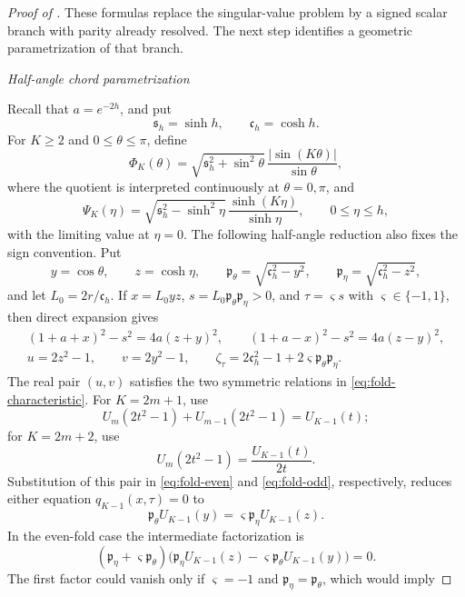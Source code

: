 \documentclass[12pt,anonymous]{iopjournal}
\numberwithin{equation}{section}
\theoremstyle{remark}
\newcommand{\proofstage}[1]{%
  \par\medskip\noindent\textit{#1}\par\nobreak\smallskip}
\begin{document}
\begin{proof}[Proof of ]
These formulas replace the singular-value problem by a signed scalar branch
with parity already resolved.  The next step identifies a geometric
parametrization of that branch.

\proofstage{Half-angle chord parametrization}
Recall that \(a=e^{-2h}\), and put
\[
 \mathfrak s_h=\sinh h,\qquad \mathfrak c_h=\cosh h.
\]
For \(K\geq2\) and \(0\leq\theta\leq\pi\), define
\begin{equation}\label{eq:Phi-Psi-def}
 \Phi_K(\theta)=\sqrt{\mathfrak s_h^2+\sin^2\theta}\,
 \frac{|\sin(K\theta)|}{\sin\theta},
\end{equation}
where the quotient is interpreted continuously at \(\theta=0,\pi\),
and
\[
 \Psi_K(\eta)=\sqrt{\mathfrak s_h^2-\sinh^2\eta}\,
 \frac{\sinh(K\eta)}{\sinh\eta},\qquad0\leq\eta\leq h,
\]
with the limiting value at \(\eta=0\).  The following half-angle reduction
also fixes the sign convention.  Put
\[
 y=\cos\theta,\qquad z=\cosh\eta,\qquad
 \mathfrak p_\theta=\sqrt{\mathfrak c_h^2-y^2},\qquad
 \mathfrak p_\eta=\sqrt{\mathfrak c_h^2-z^2},
\]
and let \(L_0=2r/\mathfrak c_h\).  If
\(x=L_0yz\), \(s=L_0\mathfrak p_\theta\mathfrak p_\eta>0\), and
\(\tau=\varsigma s\) with \(\varsigma\in\{-1,1\}\), then direct
expansion gives
\begin{equation}\label{eq:half-variable-identities}
\begin{gathered}
 (1+a+x)^2-s^2=4a(z+y)^2,\qquad
 (1+a-x)^2-s^2=4a(z-y)^2,\\
 u=2z^2-1,\qquad v=2y^2-1,\qquad
 \zeta_\tau=2\mathfrak c_h^2-1
 +2\varsigma\mathfrak p_\theta\mathfrak p_\eta.
\end{gathered}
\end{equation}
The real pair \((u,v)\) satisfies the two symmetric relations in
\eqref{eq:fold-characteristic}.
For \(K=2m+1\), use
\[
 U_m(2t^2-1)+U_{m-1}(2t^2-1)=U_{K-1}(t);
\]
for \(K=2m+2\), use
\[
 U_m(2t^2-1)=\frac{U_{K-1}(t)}{2t}.
\]
Substitution of this pair in \eqref{eq:fold-even} and
\eqref{eq:fold-odd}, respectively, reduces either equation
\(q_{K-1}(x,\tau)=0\) to
\begin{equation}\label{eq:signed-half-chord}
 \mathfrak p_\theta U_{K-1}(y)
 =\varsigma\mathfrak p_\eta U_{K-1}(z).
\end{equation}
In the even-fold case the intermediate factorization is
\[
 (\mathfrak p_\eta+\varsigma\mathfrak p_\theta)
 \bigl(\mathfrak p_\eta U_{K-1}(z)
 -\varsigma\mathfrak p_\theta U_{K-1}(y)\bigr)=0.
\]
The first factor could vanish only if \(\varsigma=-1\) and
\(\mathfrak p_\eta=\mathfrak p_\theta\), which would imply

\end{proof}
\end{document}
